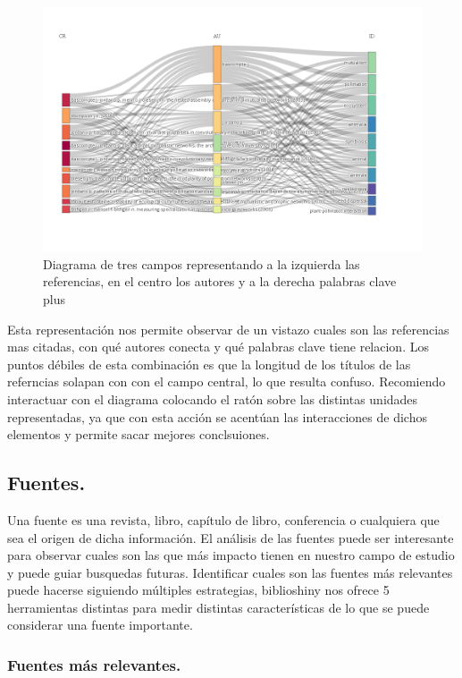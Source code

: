 \documentclass[
]{article}
\begin{document}
\begin{figure}
\centering
\includegraphics{ThreeFieldsPlot.png}
\caption{Diagrama de tres campos representando a la izquierda las
referencias, en el centro los autores y a la derecha palabras clave
plus}
\end{figure}

Esta representación nos permite observar de un vistazo cuales son las
referencias mas citadas, con qué autores conecta y qué palabras clave
tiene relacion. Los puntos débiles de esta combinación es que la
longitud de los títulos de las referncias solapan con con el campo
central, lo que resulta confuso. Recomiendo interactuar con el diagrama
colocando el ratón sobre las distintas unidades representadas, ya que
con esta acción se acentúan las interacciones de dichos elementos y
permite sacar mejores conclsuiones.

\hypertarget{fuentes.}{%
\subsection{Fuentes.}\label{fuentes.}}

Una fuente es una revista, libro, capítulo de libro, conferencia o
cualquiera que sea el origen de dicha información. El análisis de las
fuentes puede ser interesante para observar cuales son las que más
impacto tienen en nuestro campo de estudio y puede guiar busquedas
futuras. Identificar cuales son las fuentes más relevantes puede hacerse
siguiendo múltiples estrategias, biblioshiny nos ofrece 5 herramientas
distintas para medir distintas características de lo que se puede
considerar una fuente importante.

\hypertarget{fuentes-muxe1s-relevantes.}{%
\subsubsection{Fuentes más
relevantes.}\label{fuentes-muxe1s-relevantes.}}
\end{document}
